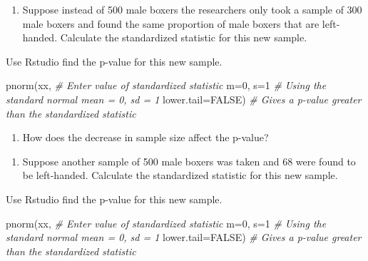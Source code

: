 \documentclass[
]{report}
\newenvironment{Shaded}{\begin{snugshade}}{\end{snugshade}}
\newcommand{\AttributeTok}[1]{\textcolor[rgb]{0.77,0.63,0.00}{#1}}
\newcommand{\CommentTok}[1]{\textcolor[rgb]{0.56,0.35,0.01}{\textit{#1}}}
\newcommand{\ConstantTok}[1]{\textcolor[rgb]{0.00,0.00,0.00}{#1}}
\newcommand{\DecValTok}[1]{\textcolor[rgb]{0.00,0.00,0.81}{#1}}
\newcommand{\FunctionTok}[1]{\textcolor[rgb]{0.00,0.00,0.00}{#1}}
\newcommand{\NormalTok}[1]{#1}
\providecommand{\tightlist}{%
  \setlength{\itemsep}{0pt}\setlength{\parskip}{0pt}}
\begin{document}
\vspace{0.3in}

\begin{enumerate}
\def\labelenumi{\arabic{enumi}.}
\setcounter{enumi}{13}
\tightlist
\item
  Suppose instead of 500 male boxers the researchers only took a sample of 300 male boxers and found the same proportion of male boxers that are left-handed. Calculate the standardized statistic for this new sample.
\end{enumerate}

\vspace{1in}

Use Rstudio find the p-value for this new sample.

\begin{Shaded}
\begin{Highlighting}[]
\FunctionTok{pnorm}\NormalTok{(xx, }\CommentTok{\# Enter value of standardized statistic}
      \AttributeTok{m=}\DecValTok{0}\NormalTok{, }\AttributeTok{s=}\DecValTok{1} \CommentTok{\# Using the standard normal mean = 0, sd = 1}
      \AttributeTok{lower.tail=}\ConstantTok{FALSE}\NormalTok{) }\CommentTok{\# Gives a p{-}value greater than the standardized statistic}
\end{Highlighting}
\end{Shaded}

\begin{enumerate}
\def\labelenumi{\arabic{enumi}.}
\setcounter{enumi}{14}
\tightlist
\item
  How does the decrease in sample size affect the p-value?
\end{enumerate}

\vspace{0.3in}

\begin{enumerate}
\def\labelenumi{\arabic{enumi}.}
\setcounter{enumi}{15}
\tightlist
\item
  Suppose another sample of 500 male boxers was taken and 68 were found to be left-handed. Calculate the standardized statistic for this new sample.
\end{enumerate}

Use Rstudio find the p-value for this new sample.

\begin{Shaded}
\begin{Highlighting}[]
\FunctionTok{pnorm}\NormalTok{(xx, }\CommentTok{\# Enter value of standardized statistic}
      \AttributeTok{m=}\DecValTok{0}\NormalTok{, }\AttributeTok{s=}\DecValTok{1} \CommentTok{\# Using the standard normal mean = 0, sd = 1}
      \AttributeTok{lower.tail=}\ConstantTok{FALSE}\NormalTok{) }\CommentTok{\# Gives a p{-}value greater than the standardized statistic}
\end{Highlighting}
\end{Shaded}
\end{document}
